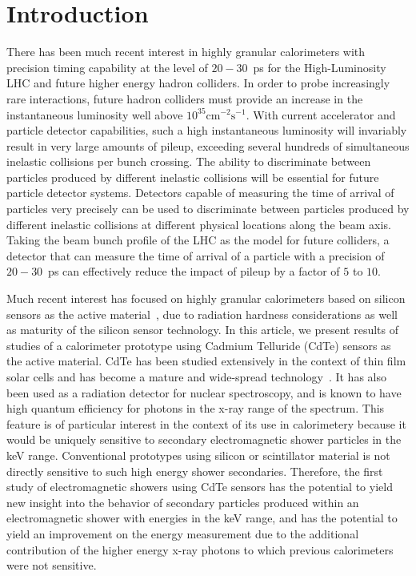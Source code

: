 \section{Introduction} 

There has been much recent interest in highly granular calorimeters with 
precision timing capability at the level of $20-30$~ps for the High-Luminosity
LHC and future higher energy hadron colliders. In order to probe increasingly
rare interactions, future hadron colliders must provide an increase in the
instantaneous luminosity well above $10^{35}\mathrm{cm}^{-2}\mathrm{s}^{-1}$.
With current accelerator and particle detector capabilities, such a high 
instantaneous luminosity will invariably result in very large amounts
of pileup, exceeding several hundreds of simultaneous inelastic collisions per
bunch crossing. The ability to discriminate between particles produced by 
different inelastic collisions will be essential for future particle detector
systems. Detectors capable of measuring the time of arrival of particles
very precisely can be used to discriminate between particles produced by
different inelastic collisions at different physical locations along the beam
axis. Taking the beam bunch profile of the LHC as the model for future
colliders, a detector that can measure the time of arrival of a particle
with a precision of $20-30$~ps can effectively reduce the impact of
pileup by a factor of $5$ to $10$. 

Much recent interest has focused on highly granular calorimeters based on 
silicon sensors as the active material~\cite{Adloff:2009,Butler:2020886}, due to
radiation hardness considerations as well as maturity of the silicon sensor
technology. In this article, we present results of studies of a 
calorimeter prototype using Cadmium Telluride (CdTe) sensors as the 
active material. CdTe has been studied extensively in the context
of thin film solar cells and has become a mature and wide-spread
technology~\cite{CdTeSolar}. It has also been used as a radiation
detector for nuclear spectroscopy, and is known to have high
quantum efficiency for photons in the x-ray range of the spectrum.
This feature is of particular interest in the context of its use
in calorimetery because it would be uniquely sensitive to secondary
electromagnetic shower particles in the keV range. Conventional prototypes 
using silicon or scintillator material is not directly sensitive to such high 
energy shower secondaries. Therefore, the first study of electromagnetic
showers using CdTe sensors has the potential to yield new insight
into the behavior of secondary particles produced within an 
electromagnetic shower with energies in the keV range, and has the potential
to yield an improvement on the energy measurement due to
the additional contribution of the higher energy x-ray photons to which previous
calorimeters were not sensitive.

